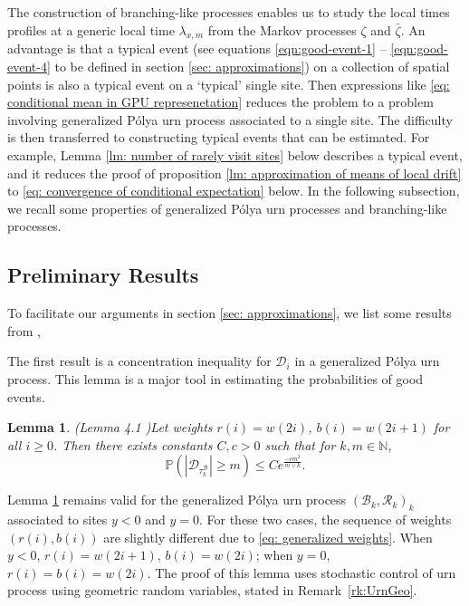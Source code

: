 \documentclass[twoside,12pt, a4paper]{article}
\newtheorem{lemma}{Lemma}[section]
\numberwithin{equation}{section}
\theoremstyle{remark}
\newcommand{\abs}[1]{\left\vert #1 \right\vert}
\begin{document}
	The construction of branching-like processes enables us to study the local times profiles at a generic local time $\lambda_{x,m}$ from the Markov processes $\zeta$ and $\bar{\zeta}$. An advantage is that a typical event ({see equations \eqref{eqn:good-event-1} -- \eqref{eqn:good-event-4} to be defined in section \ref{sec: approximations}}) on a collection of spatial points is also a typical event on a `typical' single site. Then expressions like \eqref{eq: conditional mean in GPU represenetation} reduces the problem to a problem involving generalized P\'{o}lya urn process associated to a single site. The difficulty is then transferred to constructing typical events that can be estimated. For example, Lemma \ref{lm: number of rarely visit sites} below describes a typical event, and it reduces the proof of proposition \ref{lm: approximation of means of local drift} to \eqref{eq: convergence of conditional expectation} below. In the following subsection, we recall some properties of generalized P\'{o}lya urn processes and branching-like processes.
	
	\subsection{Preliminary Results}
	To facilitate our arguments in section \ref{sec: approximations}, we list some results from \cite{KMP23,T96}, 
	
	The first result is a concentration inequality for $\mathcal{D}_i$ in a generalized P\'{o}lya urn process. This lemma is a major tool in estimating the probabilities of good events.
	\begin{lemma}(Lemma 4.1 \cite{KMP23})\label{lm: concentration inequality}
		Let weights $r(i) = w(2i)$, $b(i)= w(2i+1) $ for all $i\geq 0$. Then there exists constants $C,c>0$ such that for $k, m \in \mathbb{N}$,
		$$
		\mathbb{P}\left(  \abs{ \mathcal{D}_{\tau_k^{\mathcal{B}}}   } \geq m \right) \leq C e^{\frac{-cm^2}{m \vee k}}.
		$$
	\end{lemma} 
	Lemma \ref{lm: concentration inequality} remains valid for the generalized P\'{o}lya urn process $(\mathcal{B}_{k},\mathcal{R}_{k})_k$ associated to sites $y<0$ and $y=0$. For these two cases, the sequence of weights $(r(i),b(i))$ are slightly different due to \eqref{eq: generalized weights}. When $y<0$, $r(i) = w(2i+1)$, $b(i)= w(2i) $; when $y=0$, $r(i) = b(i)=w(2i)$. The proof of this lemma uses stochastic control of urn process using geometric random variables, stated in Remark~\ref{rk:UrnGeo}.
	
\end{document}
